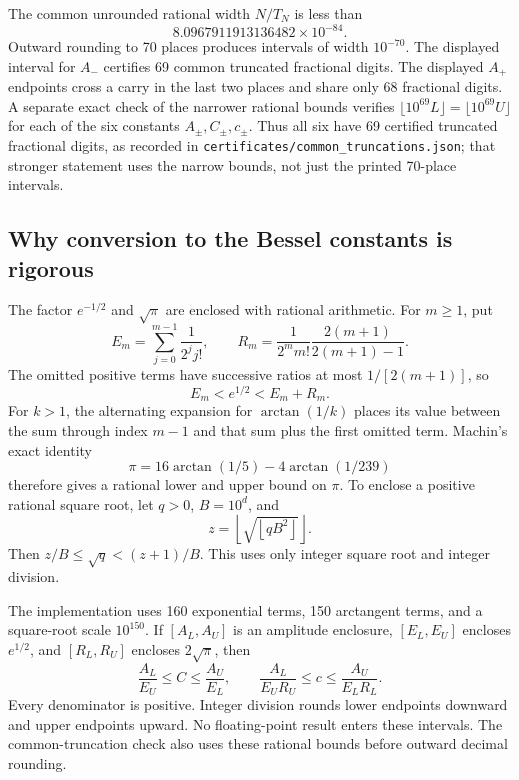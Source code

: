 \documentclass[11pt]{article}
\theoremstyle{remark}\newtheorem{remark}[theorem]{Remark}
\begin{document}
The common unrounded rational width $N/T_N$ is less than
\begin{equation}\label{rrm:eq:tinywidth}
 8.0967911913136482\times10^{-84}.
\end{equation}
Outward rounding to 70 places produces intervals of width $10^{-70}$. The displayed interval for $A_-$ certifies 69 common truncated fractional digits. The displayed $A_+$ endpoints cross a carry in the last two places and share only 68 fractional digits. A separate exact check of the narrower rational bounds verifies $\lfloor10^{69}L\rfloor=\lfloor10^{69}U\rfloor$ for each of the six constants $A_\pm,C_\pm,c_\pm$. Thus all six have 69 certified truncated fractional digits, as recorded in \texttt{certificates/common\_truncations.json}; that stronger statement uses the narrow bounds, not just the printed 70-place intervals.

\subsection{Why conversion to the Bessel constants is rigorous}
The factor $e^{-1/2}$ and $\sqrt\pi$ are enclosed with rational arithmetic. For $m\ge1$, put
\[
 E_m=\sum_{j=0}^{m-1}\frac1{2^jj!},\qquad
 R_m=\frac1{2^mm!}\frac{2(m+1)}{2(m+1)-1}.
\]
The omitted positive terms have successive ratios at most $1/[2(m+1)]$, so
\begin{equation}\label{rrm:eq:expbound}
 E_m<e^{1/2}<E_m+R_m.
\end{equation}
For $k>1$, the alternating expansion for $\arctan(1/k)$ places its value between the sum through index $m-1$ and that sum plus the first omitted term. Machin's exact identity
\[
 \pi=16\arctan(1/5)-4\arctan(1/239)
\]
therefore gives a rational lower and upper bound on $\pi$. To enclose a positive rational square root, let $q>0$, $B=10^d$, and
\[
 z=\left\lfloor\sqrt{\left\lfloor qB^2\right\rfloor}\right\rfloor.
\]
Then $z/B\le\sqrt q<(z+1)/B$. This uses only integer square root and integer division.

The implementation uses 160 exponential terms, 150 arctangent terms, and a square-root scale $10^{150}$. If $[A_L,A_U]$ is an amplitude enclosure, $[E_L,E_U]$ encloses $e^{1/2}$, and $[R_L,R_U]$ encloses $2\sqrt\pi$, then
\begin{equation}\label{rrm:eq:convert}
 \frac{A_L}{E_U}\le C\le\frac{A_U}{E_L},\qquad
 \frac{A_L}{E_UR_U}\le c\le\frac{A_U}{E_LR_L}.
\end{equation}
Every denominator is positive. Integer division rounds lower endpoints downward and upper endpoints upward. No floating-point result enters these intervals. The common-truncation check also uses these rational bounds before outward decimal rounding.
\end{document}
